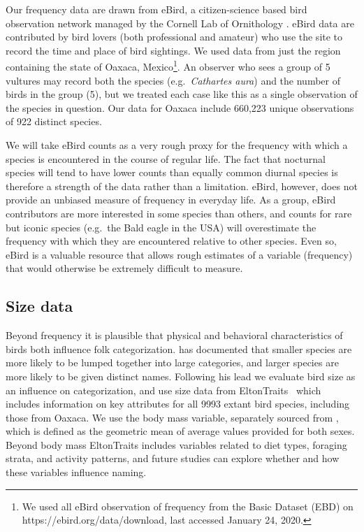 \documentclass[10pt,letterpaper]{article}
\begin{document}
Our frequency data are drawn from eBird, a citizen-science based bird observation network managed by the Cornell Lab of Ornithology \cite{sullivan2009ebird}.  eBird data are contributed by bird lovers (both professional and amateur) who use the site to record the time and place of bird sightings.  We used data from just the region containing the state of Oaxaca, Mexico\footnote{We used all eBird observation of frequency from the Basic Dataset (EBD) on https://ebird.org/data/download, last accessed January 24, 2020.}. An observer who sees a group of 5 vultures may record both the species (e.g.\ \emph{Cathartes aura}) and the number of birds in the group (5), but we treated each case like this as a single observation of the species in question. Our data for Oaxaca include 660,223 unique observations of 922 distinct species. 

We will take eBird counts as a very rough proxy for the frequency with which a species is encountered in the course of regular life. The fact that nocturnal species will tend to have lower counts than equally common diurnal species is therefore a strength of the data rather than a limitation. eBird, however,  does not provide an unbiased measure of frequency in everyday life. As a group, eBird contributors are more interested in some species than others, and counts for rare but iconic species (e.g.\ the Bald eagle in the USA) will overestimate the frequency with which they are encountered relative to other species. Even so, eBird is a valuable resource that allows rough estimates of a variable (frequency) that would otherwise be extremely difficult to measure.  


\subsection{Size data}
Beyond frequency it is plausible that physical and behavioral characteristics of birds both influence folk categorization.  has documented that smaller species are more likely to be lumped together into large categories, and larger species are more likely to be given distinct names. Following his lead we evaluate bird size as an influence on categorization, and use size data from EltonTraits~\cite{wilman2014eltontraits} which includes information on key attributes for all 9993 extant bird species, including those from Oaxaca.  We use the body mass variable, separately sourced from \cite{dunning2007crc}, which is defined as the geometric mean of average values provided for both sexes. Beyond body mass EltonTraits includes variables related to diet types, foraging strata, and activity patterns, and future studies can explore whether and how these variables influence naming. 
\end{document}
